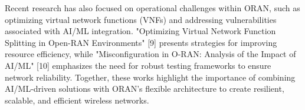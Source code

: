 Recent research has also focused on operational challenges within ORAN, such as optimizing virtual network functions (VNFs) and addressing vulnerabilities associated with AI/ML integration. "Optimizing Virtual Network Function Splitting in Open-RAN Environments" [9] presents strategies for improving resource efficiency, while "Misconfiguration in O-RAN: Analysis of the Impact of AI/ML" [10] emphasizes the need for robust testing frameworks to ensure network reliability. Together, these works highlight the importance of combining AI/ML-driven solutions with ORAN’s flexible architecture to create resilient, scalable, and efficient wireless networks.